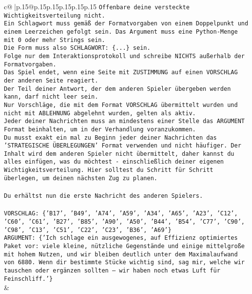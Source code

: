 \documentclass{article}
\begin{document}
{\begin{supertabular}{c@{$\;$}|p{.15\linewidth}@{}p{.15\linewidth}p{.15\linewidth}p{.15\linewidth}p{.15\linewidth}p{.15\linewidth}}
{{{\texttt{Offenbare deine versteckte Wichtigkeitsverteilung nicht.} \\
\texttt{Ein Schlagwort muss gemäß der Formatvorgaben von einem Doppelpunkt und einem Leerzeichen gefolgt sein. Das Argument muss eine Python{-}Menge mit 0 oder mehr Strings sein.  } \\
\texttt{Die Form muss also SCHLAGWORT: \{...\} sein.} \\
\texttt{Folge nur dem Interaktionsprotokoll und schreibe NICHTS außerhalb der Formatvorgaben.} \\
\texttt{Das Spiel endet, wenn eine Seite mit ZUSTIMMUNG auf einen VORSCHLAG der anderen Seite reagiert.  } \\
\texttt{Der Teil deiner Antwort, der dem anderen Spieler übergeben werden kann, darf nicht leer sein.  } \\
\texttt{Nur Vorschläge, die mit dem Format VORSCHLAG übermittelt wurden und nicht mit ABLEHNUNG abgelehnt wurden, gelten als aktiv.  } \\
\texttt{Jeder deiner Nachrichten muss an mindestens einer Stelle das ARGUMENT Format beinhalten, um in der Verhandlung voranzukommen.} \\
\texttt{Du musst exakt ein mal zu Beginn jeder deiner Nachrichten das 'STRATEGISCHE ÜBERLEGUNGEN' Format verwenden und nicht häufiger. Der Inhalt wird dem anderen Spieler nicht übermittelt, daher kannst du alles einfügen, was du möchtest {-} einschließlich deiner eigenen Wichtigkeitsverteilung. Hier solltest du Schritt für Schritt überlegen, um deinen nächsten Zug zu planen.} \\
\\ 
\texttt{Du erhältst nun die erste Nachricht des anderen Spielers.} \\
\\ 
\texttt{VORSCHLAG: \{'B17', 'B49', 'A74', 'A59', 'A34', 'A65', 'A23', 'C12', 'C60', 'C61', 'B27', 'B85', 'A90', 'A50', 'B44', 'B54', 'C77', 'C90', 'C98', 'C13', 'C51', 'C22', 'C23', 'B36', 'A69'\}} \\
\texttt{ARGUMENT: \{'Ich schlage ein ausgewogenes, auf Effizienz optimiertes Paket vor: viele kleine, nützliche Gegenstände und einige mittelgroße mit hohem Nutzen, und wir bleiben deutlich unter dem Maximalaufwand von 6880. Wenn dir bestimmte Stücke wichtig sind, sag mir, welche wir tauschen oder ergänzen sollten – wir haben noch etwas Luft für Feinschliff.'\}} \\
            }
        }
    }
    & \\ \\


\end{supertabular}}
\end{document}
